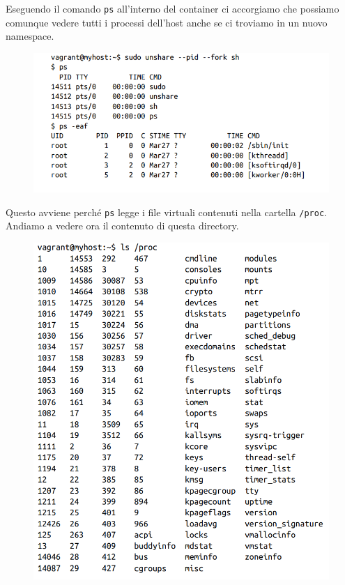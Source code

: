 Eseguendo il comando \verb|ps| all'interno del container ci accorgiamo che
possiamo comunque vedere tutti i processi dell'host anche se ci troviamo
in un nuovo namespace.

\begin{figure}[H]
    \centering
    \includegraphics[width=12cm, keepaspectratio]{capitoli/os_security/imgs/pid5.png}
\end{figure}

Questo avviene perché \verb|ps| legge i file virtuali contenuti nella cartella
\verb|/proc|. Andiamo a vedere ora il contenuto di questa directory.

\begin{figure}[H]
    \centering
    \includegraphics[width=12cm, keepaspectratio]{capitoli/os_security/imgs/pid6.png}
\end{figure}

